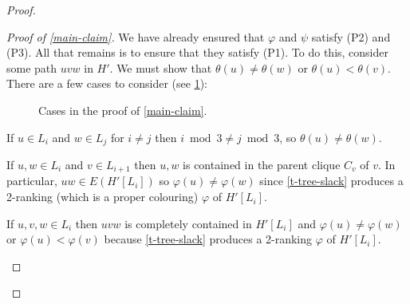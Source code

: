 \documentclass[kpfonts]{patmorin}
\theoremstyle{named}
\begin{document}
\begin{proof}
\begin{proof}[Proof of \cref{main-claim}]
       We have already ensured that $\varphi$ and $\psi$ satisfy (P2) and (P3). All that remains is to ensure that they satisfy (P1).  To do this, consider some path $uvw$ in $H'$.  We must show that $\theta(u)\neq\theta(w)$ or $\theta(u)<\theta(v)$.  There are a few cases to consider (see \cref{cases}):
       \begin{figure}
            \caption{Cases in the proof of \cref{main-claim}.}
            \label{cases}
       \end{figure}
       \begin{compactenum}
          \item If $u\in L_i$ and $w\in L_j$ for $i\neq j$ then $i\bmod 3\neq j\bmod 3$, so $\theta(u)\neq\theta(w)$.

          \item If $u,w\in L_i$ and $v\in L_{i+1}$ then $u,w$ is contained in the parent clique $C_v$ of $v$.  In particular, $uw\in E(H'[L_i])$ so $\varphi(u)\neq\varphi(w)$ since \cref{t-tree-slack} produces a 2-ranking (which is a proper colouring) $\varphi$ of $H'[L_i]$.

          \item If $u,v,w\in L_i$ then $uvw$ is completely contained in $H'[L_i]$ and $\varphi(u)\neq\varphi(w)$ or $\varphi(u)<\varphi(v)$ because \cref{t-tree-slack} produces a 2-ranking $\varphi$ of $H'[L_i]$.


\end{compactenum}
\end{proof}
\end{proof}
\end{document}
